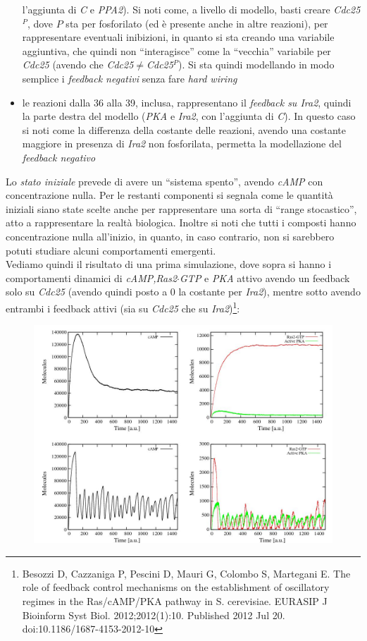 \documentclass[a4paper,12pt, oneside]{book}
\begin{document}
\begin{itemize}
  l'aggiunta di \textit{C} e \textit{PPA2}). Si noti
  come, a livello di modello, basti creare \textit{Cdc25}$^P$, dove $P$ sta
  per fosforilato (ed è presente anche in altre reazioni), per rappresentare
  eventuali inibizioni, in quanto si sta creando una variabile aggiuntiva, che
  quindi non ``interagisce'' come la ``vecchia'' variabile per \textit{Cdc25}
  (avendo che \textit{Cdc25}$\neq$\textit{Cdc25}$^P$). Si sta quindi
  modellando in modo semplice i \textit{feedback negativi} senza fare
  \textit{hard wiring}
  \item le reazioni dalla 36 alla 39, inclusa, rappresentano il
  \textit{feedback su Ira2}, quindi la parte destra del modello
  (\textit{PKA} e \textit{Ira2}, con l'aggiunta di \textit{C}). In questo caso
  si noti come la differenza della costante delle reazioni, avendo una
  costante maggiore in presenza di \textit{Ira2} non fosforilata, permetta la
  modellazione del \textit{feedback negativo}
\end{itemize}
Lo \textit{stato iniziale} prevede di avere un ``sistema spento'', avendo
\textit{cAMP} con concentrazione nulla. Per le restanti componenti si segnala
come le quantità iniziali siano state scelte anche per rappresentare una sorta
di ``range stocastico'', atto a rappresentare la realtà biologica.
Inoltre si noti che tutti i composti hanno concentrazione nulla all'inizio, in
quanto, in caso contrario, non si sarebbero potuti studiare alcuni comportamenti
emergenti.\\
Vediamo quindi il risultato di una prima simulazione, dove sopra si hanno i
comportamenti dinamici di \textit{cAMP,Ras2$\cdot$GTP} e \textit{PKA} attivo
avendo un feedback solo su \textit{Cdc25} (avendo quindi posto a 0 la costante
per \textit{Ira2}), mentre sotto avendo entrambi i feedback attivi (sia su
\textit{Cdc25} che su \textit{Ira2})\footnote{Besozzi D, Cazzaniga P, Pescini D,
  Mauri G, 
  Colombo S, Martegani E. The role of feedback control mechanisms on the
  establishment of oscillatory regimes in the Ras/cAMP/PKA pathway in
  S. cerevisiae. EURASIP J Bioinform Syst Biol. 2012;2012(1):10. Published 2012
  Jul 20. doi:10.1186/1687-4153-2012-10}:
\begin{figure}[H]
  \centering
  \includegraphics[scale = 0.25]{img/glucosimu1.jpg}
\end{figure}
\end{document}

